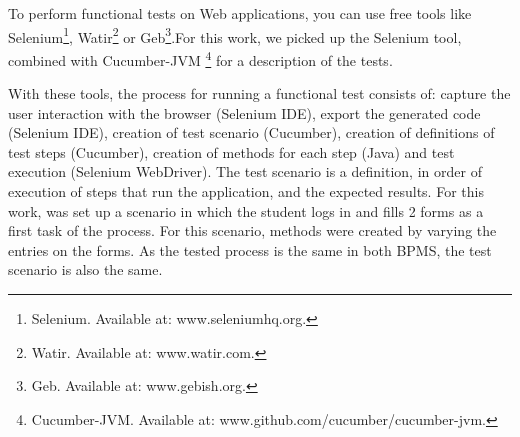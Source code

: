 \documentclass[runningheads,a4paper]{llncs}
\begin{document}
To perform functional tests on Web applications, you can use free tools like Selenium\footnote{Selenium. Available at: www.seleniumhq.org.}, Watir\footnote{Watir. Available at: www.watir.com.} or Geb\footnote{Geb. Available at: www.gebish.org.}.For this work, we picked up the Selenium tool, combined with Cucumber-JVM \footnote{Cucumber-JVM. Available at: www.github.com/cucumber/cucumber-jvm.} for a description of the tests. %


With these tools, the process for running a functional test consists of: capture the user interaction with the browser (Selenium IDE), export the generated code (Selenium IDE), creation of test scenario (Cucumber), creation of definitions of test steps (Cucumber), creation of methods for each step (Java) and test execution (Selenium WebDriver). The test scenario is a definition, in order of execution of steps that run the application, and the expected results. For this work, was set up a scenario in which the student logs in and fills 2 forms as a first task of the process. For this scenario, methods were created by varying the entries on the forms. As the tested process is the same in both BPMS, the test scenario is also the same.

\end{document}

